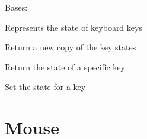\documentclass[letterpaper,10pt,english]{sphinxmanual}
\begin{document}

\begin{fulllineitems}
\label{input:serge.input.KeyState}
Bases: 

Represents the state of keyboard keys

\begin{fulllineitems}
\label{input:serge.input.KeyState.getCopy}
Return a new copy of the key states

\end{fulllineitems}


\begin{fulllineitems}
\label{input:serge.input.KeyState.getState}
Return the state of a specific key

\end{fulllineitems}


\begin{fulllineitems}
\label{input:serge.input.KeyState.setState}
Set the state for a key

\end{fulllineitems}


\end{fulllineitems}



\section{Mouse}
\label{input:mouse}
\end{document}
